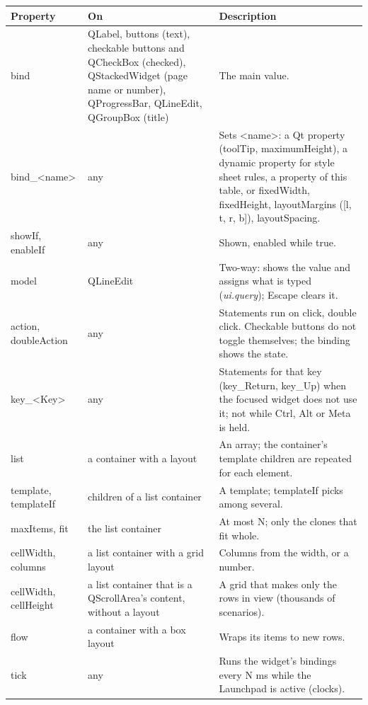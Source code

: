 \documentclass[Orbiter Developer Manual.tex]{subfiles}
\begin{document}
\begin{sloppypar}
	\begin{longtable}{ |p{}|p{}|p{}| }
	\hline\rule{0pt}{2ex}
	\textbf{Property} & \textbf{On} & \textbf{Description}\\
	\hline\rule{0pt}{2ex}
	bind & QLabel, buttons (text), checkable buttons and QCheckBox (checked), QStackedWidget (page name or number), QProgressBar, QLineEdit, QGroupBox (title) & The main value.\\
	\hline\rule{0pt}{2ex}
	bind\_<name> & any & Sets <name>: a Qt property (toolTip, maximumHeight), a dynamic property for style sheet rules, a property of this table, or fixedWidth, fixedHeight, layoutMargins ([l, t, r, b]), layoutSpacing.\\
	\hline\rule{0pt}{2ex}
	showIf, enableIf & any & Shown, enabled while true.\\
	\hline\rule{0pt}{2ex}
	model & QLineEdit & Two-way: shows the value and assigns what is typed (\textit{ui.query}); Escape clears it.\\
	\hline\rule{0pt}{2ex}
	action, doubleAction & any & Statements run on click, double click. Checkable buttons do not toggle themselves; the binding shows the state.\\
	\hline\rule{0pt}{2ex}
	key\_<Key> & any & Statements for that key (key\_Return, key\_Up) when the focused widget does not use it; not while Ctrl, Alt or Meta is held.\\
	\hline\rule{0pt}{2ex}
	list & a container with a layout & An array; the container's template children are repeated for each element.\\
	\hline\rule{0pt}{2ex}
	template, templateIf & children of a list container & A template; templateIf picks among several.\\
	\hline\rule{0pt}{2ex}
	maxItems, fit & the list container & At most N; only the clones that fit whole.\\
	\hline\rule{0pt}{2ex}
	cellWidth, columns & a list container with a grid layout & Columns from the width, or a number.\\
	\hline\rule{0pt}{2ex}
	cellWidth, cellHeight & a list container that is a QScrollArea's content, without a layout & A grid that makes only the rows in view (thousands of scenarios).\\
	\hline\rule{0pt}{2ex}
	flow & a container with a box layout & Wraps its items to new rows.\\
	\hline\rule{0pt}{2ex}
	tick & any & Runs the widget's bindings every N ms while the Launchpad is active (clocks).\\

\end{longtable}
\end{sloppypar}
\end{document}
